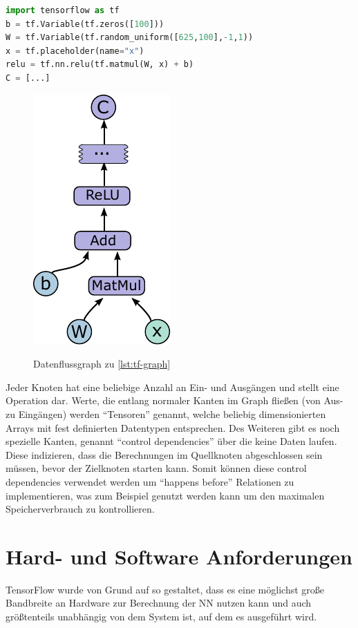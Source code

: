 \begin{minipage}{\linewidth}
\begin{lstlisting}[language=Python, label=lst:tf-graph, caption={Code-Beispiel zur Definition eines Graphen~\cite{tensorflow2015-whitepaper}}]
import tensorflow as tf
b = tf.Variable(tf.zeros([100]))
W = tf.Variable(tf.random_uniform([625,100],-1,1))
x = tf.placeholder(name="x")
relu = tf.nn.relu(tf.matmul(W, x) + b)
C = [...]
\end{lstlisting}
\end{minipage}

\begin{figure}[htb!]
	\centering
	 \includegraphics[width=.3\textwidth]{images/graph.pdf}\\
	\vspace{10pt} 
	\caption{Datenflussgraph zu \autoref{lst:tf-graph}~\cite{tensorflow2015-whitepaper}}
	\label{fig:dataflow}
\end{figure}

Jeder Knoten hat eine beliebige Anzahl an Ein- und Ausgängen und stellt eine Operation dar. Werte, die entlang normaler Kanten im Graph fließen (von Aus- zu Eingängen) werden "`Tensoren"' genannt, welche beliebig dimensionierten Arrays mit fest definierten Datentypen entsprechen. Des Weiteren gibt es noch spezielle Kanten, genannt "`control dependencies"' über die keine Daten laufen. Diese indizieren, dass die Berechnungen im Quellknoten abgeschlossen sein müssen, bevor der Zielknoten starten kann. Somit können diese control dependencies verwendet werden um "`happens before"' Relationen zu implementieren, was zum Beispiel genutzt werden kann um den maximalen Speicherverbrauch zu kontrollieren.

\section{Hard- und Software Anforderungen}
TensorFlow wurde von Grund auf so gestaltet, dass es eine möglichst große Bandbreite an Hardware zur Berechnung der \gls{NN} nutzen kann und auch größtenteils unabhängig von dem System ist, auf dem es ausgeführt wird.

